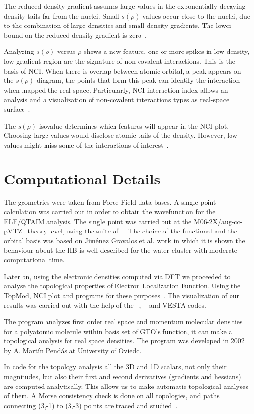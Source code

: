 The reduced density gradient assumes large values in the exponentially-decaying
density tails far from the nuclei. Small $s(\rho)$ values occur close to the
nuclei, due to the combination of large densities and small density gradients.
The lower bound on the reduced density gradient is zero~\cite{Narth2016}.

Analyzing $s(\rho)$ versus $\rho$ shows a new feature, one or more spikes in
low-density, low-gradient region are the signature of non-covalent
interactions.  This is the basis of NCI. When there is overlap between atomic
orbital, a peak appears on the $s(\rho)$ diagram, the points that form this
peak can identify the interaction when mapped the real space. Particularly, NCI
interaction index allows an analysis and a visualization of non-covalent
interactions types as real-space surface~\cite{Narth2016}.

The $s(\rho)$ isovalue determines which features will appear in the NCI plot.
Choosing large values would disclose atomic tails of the density. However, low
values might miss some of the interactions of interest~\cite{Lane2013}.


\section{Computational Details}\label{comp_details}

The geometries were taken from Force Field data bases. A single point
calculation was carried out in order to obtain the wavefunction for the
ELF/QTAIM analysis.  The single point was carried out at the
M06-2X/aug-cc-pVTZ~\cite{Zhao2006,Kendall1992,Woon1993} theory level, using the
suite of {}~\cite{g16}. The choice of the functional and the
orbital basis was based on Jiménez Gravalos et al. work
 in which it is shown the behaviour about the
\gls{HB} is well described for the water cluster with moderate computational
time.

Later on, using the electronic densities computed via DFT we proceeded to
analyse the topological properties of Electron Localization Function. Using the
TopMod, NCI plot and {} programs for these purposes~\cite{topmod09,
Boto2020, promolden}. The visualization of our results was carried out with the
help of the {}~\cite{g16}, {}~\cite{HUMP96} and VESTA
\cite{vesta} codes.

The {} program analyzes first order real space and momentum
molecular densities for a polyatomic molecule within basis set of GTO's
function, it can make a topological analysis for real space densities.  The
program was developed in 2002 by A. Martín Pendás at University of Oviedo.

In {} code for the topology analysis all the 3D and 1D scalars, not
only their magnitudes, but also their first and second derivatives (gradients
and hessians) are computed analytically. This allows us to make automatic
topological analyses of them. A Morse consistency check is done on all
topologies, and paths connecting (3,-1) to (3,-3) points are traced and
studied~\cite{promolden}.

